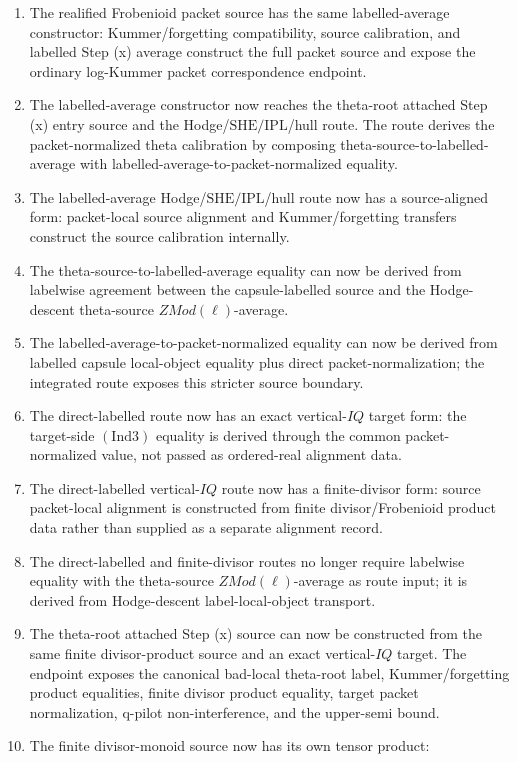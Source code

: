 \documentclass[11pt]{article}
\newcommand{\Ind}{\ensuremath{\mathrm{Ind}}}
\newcommand{\SHE}{\ensuremath{\mathrm{SHE}}}
\newcommand{\IPL}{\ensuremath{\mathrm{IPL}}}
\theoremstyle{plain}
\theoremstyle{definition}
\theoremstyle{remark}
\begin{document}
\begin{enumerate}
\item The realified Frobenioid packet source has the same labelled-average
  constructor: Kummer/forgetting compatibility, source calibration, and
  labelled Step (x) average construct the full packet source and expose the
  ordinary log-Kummer packet correspondence endpoint.
\item The labelled-average constructor now reaches the theta-root attached
  Step (x) entry source and the Hodge/\(\SHE/\IPL\)/hull route.  The route
  derives the packet-normalized theta calibration by composing
  theta-source-to-labelled-average with labelled-average-to-packet-normalized
  equality.
\item The labelled-average Hodge/\(\SHE/\IPL\)/hull route now has a
  source-aligned form: packet-local source alignment and Kummer/forgetting
  transfers construct the source calibration internally.
\item The theta-source-to-labelled-average equality can now be derived from
  labelwise agreement between the capsule-labelled source and the
  Hodge-descent theta-source \(ZMod(\ell)\)-average.
\item The labelled-average-to-packet-normalized equality can now be derived
  from labelled capsule local-object equality plus direct packet-normalization;
  the integrated route exposes this stricter source boundary.
\item The direct-labelled route now has an exact vertical-\(IQ\) target form:
  the target-side \((\Ind3)\) equality is derived through the common
  packet-normalized value, not passed as ordered-real alignment data.
\item The direct-labelled vertical-\(IQ\) route now has a finite-divisor form:
  source packet-local alignment is constructed from finite divisor/Frobenioid
  product data rather than supplied as a separate alignment record.
\item The direct-labelled and finite-divisor routes no longer require
  labelwise equality with the theta-source \(ZMod(\ell)\)-average as route
  input; it is derived from Hodge-descent label-local-object transport.
\item The theta-root attached Step (x) source can now be constructed from the
  same finite divisor-product source and an exact vertical-\(IQ\) target.  The
  endpoint exposes the canonical bad-local theta-root label, Kummer/forgetting
  product equalities, finite divisor product equality, target packet
  normalization, q-pilot non-interference, and the upper-semi bound.
\item The finite divisor-monoid source now has its own tensor product:

\end{enumerate}
\end{document}
